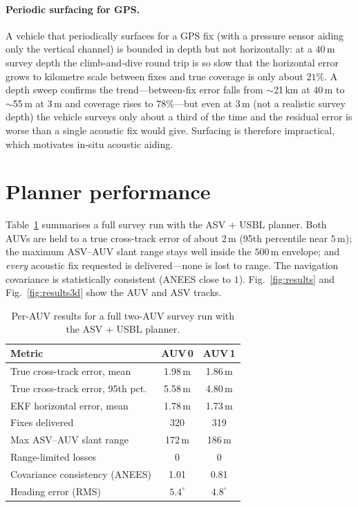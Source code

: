 \documentclass[12pt,a4paper,oneside]{book}
\newcommand{\figref}[1]{Fig.~\ref{#1}}
\newcommand{\tabref}[1]{Table~\ref{#1}}
\begin{document}
\paragraph{Periodic surfacing for GPS.} A vehicle that periodically surfaces for a GPS fix (with a pressure
sensor aiding only the vertical channel) is bounded in depth but not horizontally: at a $40$\,m survey depth
the climb-and-dive round trip is so slow that the horizontal error grows to kilometre scale between fixes
and true coverage is only about $21\%$. A depth sweep confirms the trend---between-fix error falls from
$\sim$21\,km at $40$\,m to $\sim$55\,m at $3$\,m and coverage rises to $78\%$---but even at $3$\,m (not a
realistic survey depth) the vehicle surveys only about a third of the time and the residual error is worse
than a single acoustic fix would give. Surfacing is therefore impractical, which motivates in-situ acoustic
aiding.

\section{Planner performance}
\label{sec:perf}
\tabref{tab:results} summarises a full survey run with the ASV + USBL planner. Both AUVs are held to a true
cross-track error of about $2$\,m (95th percentile near $5$\,m); the maximum ASV--AUV slant range stays well
inside the $500$\,m envelope; and \emph{every} acoustic fix requested is delivered---none is lost to range.
The navigation covariance is statistically consistent (ANEES close to $1$). \figref{fig:results} and
\figref{fig:results3d} show the AUV and ASV tracks.

\begin{table}[H]
\centering
\caption{Per-AUV results for a full two-AUV survey run with the ASV + USBL planner.}
\label{tab:results}
\begin{tabular}{@{}lcc@{}}
\toprule
Metric & AUV\,0 & AUV\,1 \\
\midrule
True cross-track error, mean & 1.98\,m & 1.86\,m \\
True cross-track error, 95th pct.\ & 5.58\,m & 4.80\,m \\
EKF horizontal error, mean & 1.78\,m & 1.73\,m \\
Fixes delivered & 320 & 319 \\
Max ASV--AUV slant range & 172\,m & 186\,m \\
Range-limited losses & 0 & 0 \\
Covariance consistency (ANEES) & 1.01 & 0.81 \\
Heading error (RMS) & $5.4^{\circ}$ & $4.8^{\circ}$ \\
\bottomrule
\end{tabular}
\end{table}
\end{document}
